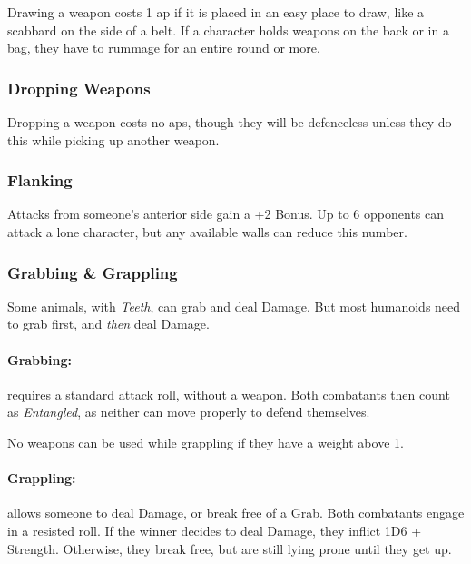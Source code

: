 \begin{multicols}{2}
Drawing a weapon costs 1 \gls{ap} if it is placed in an easy place to draw, like a scabbard on the side of a belt.
If a character holds weapons on the back or in a bag, they have to rummage for an entire round or more.

\subsubsection[Dropping Weapon -- Cost: 0 \gls{ap}]{Dropping Weapons}

Dropping a weapon costs no \glspl{ap}, though they will be defenceless unless they do this while picking up another weapon.


\subsubsection[Flanking: Gain +2 to attack]{Flanking}\label{flank}

Attacks from someone's anterior side gain a +2 Bonus.
Up to 6 opponents can attack a lone character, but any available walls can reduce this number.

\subsubsection{Grabbing \& Grappling}
\label{grappling}
Some animals, with \textit{Teeth}, can grab and deal Damage.
But most humanoids need to grab first, and \emph{then} deal Damage.

\paragraph[Grabs: Make an attack without any weapon bonus. Both combatants are \textit{Entangled}. Cost: 1 \gls{ap}]{Grabbing:}
requires a standard attack roll, without a weapon.
Both combatants then count as \textit{Entangled}, as neither can move properly to defend themselves.
\label{grab}

No weapons can be used while grappling if they have a \gls{weight} above 1.

\paragraph[Grapple: Make an opposted roll of Strength + Combat.  Success means the combatant can either break free or inflict Damage.  Cost: 3 \gls{ap}]{Grappling:}
allows someone to deal Damage, or break free of a Grab.
Both combatants engage in a resisted  roll.
If the winner decides to deal Damage, they inflict 1D6 + Strength.
Otherwise, they break free, but are still lying prone until they get up.
\label{grapple}


\end{multicols}
